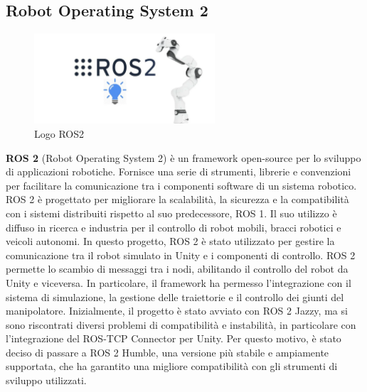 \documentclass[11pt]{report}
\begin{document}
\subsection{Robot Operating System 2}

\begin{figure}[H]
    \centering
    \includegraphics[width=0.6\textwidth]{images/ROS2.png}
    \caption{Logo ROS2}
    \label{fig:ROS2}
\end{figure}

\textbf{ROS 2} (Robot Operating System 2) \cite{ROS2} è un framework open-source per lo sviluppo di applicazioni robotiche. Fornisce una serie di strumenti, librerie e convenzioni per facilitare la comunicazione tra i componenti software di un sistema robotico. ROS 2 è progettato per migliorare la scalabilità, la sicurezza e la compatibilità con i sistemi distribuiti rispetto al suo predecessore, ROS 1. Il suo utilizzo è diffuso in ricerca e industria per il controllo di robot mobili, bracci robotici e veicoli autonomi.
In questo progetto, ROS 2 è stato utilizzato per gestire la comunicazione tra il robot simulato in Unity e i componenti di controllo. ROS 2 permette lo scambio di messaggi tra i nodi, abilitando il controllo del robot da Unity e viceversa. In particolare, il framework ha permesso l'integrazione con il sistema di simulazione, la gestione delle traiettorie e il controllo dei giunti del manipolatore.
Inizialmente, il progetto è stato avviato con ROS 2 Jazzy, ma si sono riscontrati diversi problemi di compatibilità e instabilità, in particolare con l'integrazione del ROS-TCP Connector per Unity. Per questo motivo, è stato deciso di passare a ROS 2 Humble, una versione più stabile e ampiamente supportata, che ha garantito una migliore compatibilità con gli strumenti di sviluppo utilizzati.
\end{document}
